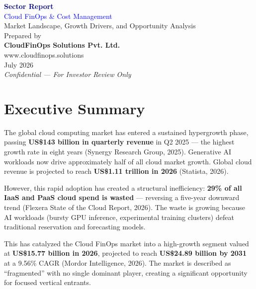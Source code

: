 \documentclass[a4paper,11pt]{article}
\begin{document}
\begin{titlepage}
\begin{center}
\vspace*{3cm}

{\Huge\bfseries\textcolor{navy}{Sector Report}}\\[0.5cm]
{\LARGE\textcolor{blue}{Cloud FinOps \& Cost Management}}\\[0.3cm]
{\large\textcolor{slate}{Market Landscape, Growth Drivers, and Opportunity Analysis}}\\[2cm]

{\large Prepared by}\\[0.3cm]
{\Large\bfseries CloudFinOps Solutions Pvt. Ltd.}\\[0.2cm]
{\normalsize\textcolor{slate}{www.cloudfinops.solutions}}\\[3cm]

{\large July 2026}\\[1cm]

\textcolor{slate}{\textit{Confidential --- For Investor Review Only}}

\vfill
\end{center}
\end{titlepage}

\tableofcontents
\newpage

\section{Executive Summary}

The global cloud computing market has entered a sustained hypergrowth phase, passing \textbf{US\$143 billion in quarterly revenue} in Q2 2025 --- the highest growth rate in eight years (Synergy Research Group, 2025). Generative AI workloads now drive approximately half of all cloud market growth. Global cloud revenue is projected to reach \textbf{US\$1.11 trillion in 2026} (Statista, 2026).

However, this rapid adoption has created a structural inefficiency: \textbf{29\% of all IaaS and PaaS cloud spend is wasted} --- reversing a five-year downward trend (Flexera State of the Cloud Report, 2026). The waste is growing because AI workloads (bursty GPU inference, experimental training clusters) defeat traditional reservation and forecasting models.

This has catalyzed the Cloud FinOps market into a high-growth segment valued at \textbf{US\$15.77 billion in 2026}, projected to reach \textbf{US\$24.89 billion by 2031} at a 9.56\% CAGR (Mordor Intelligence, 2026). The market is described as ``fragmented'' with no single dominant player, creating a significant opportunity for focused vertical entrants.
\end{document}
